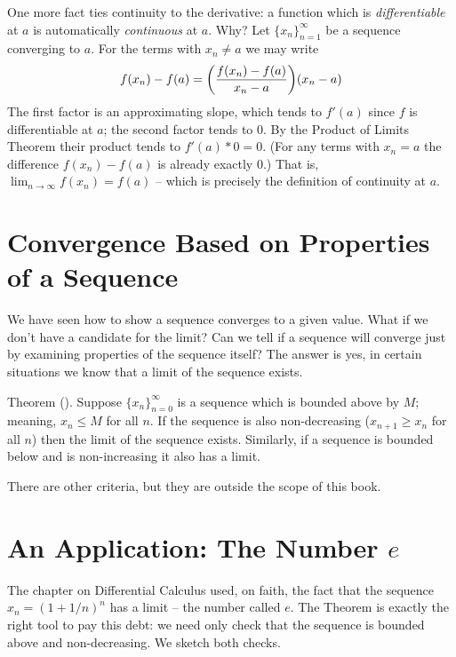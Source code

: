 One more fact ties continuity to the derivative: a function which is
{\it differentiable\/} at $a$ is automatically {\it continuous\/} at $a$.
Why? Let $\{x_n\}_{n=1}^\infty$ be a sequence converging to $a$. For the
terms with $x_n \ne a$ we may write
$$
f(x_n) - f(a) = \biggl( {f(x_n) - f(a) \over x_n - a} \biggr) (x_n - a)
$$
The first factor is an approximating slope, which tends to $f'(a)$ since $f$
is differentiable at $a$; the second factor tends to $0$. By the Product of
Limits Theorem their product tends to $f'(a) * 0 = 0$. (For any terms with
$x_n = a$ the difference $f(x_n) - f(a)$ is already exactly $0$.) That is,
$\lim_{n \rightarrow \infty} f(x_n) = f(a)$ -- which is precisely the
definition of continuity at $a$.

\section{Convergence Based on Properties of a Sequence}
We have seen how to show a sequence converges to a given value. What if 
we don't have a candidate for the limit? Can we tell if a sequence will 
converge just by examining properties of the sequence itself? The answer is 
yes, in certain situations we know that a limit of the sequence exists.

\proclaim Theorem (). Suppose $\{x_n\}_{n=0}^\infty$ is a 
sequence which is bounded above by $M$; meaning, $x_n \le M$ for all $n$.
If the sequence is also non-decreasing ($x_{n+1} \ge x_n$ for all $n$) then
the limit of the sequence exists. Similarly, if a sequence is bounded 
below and is non-increasing it also has a limit.

There are other criteria, but they are outside the scope of this book.

\section{An Application: The Number $e$}
The chapter on Differential Calculus used, on faith, the fact that the
sequence $x_n = (1 + 1/n)^n$ has a limit -- the number called $e$. The
 Theorem is exactly the right tool to pay this
debt: we need only check that the sequence is bounded above and
non-decreasing. We sketch both checks.

